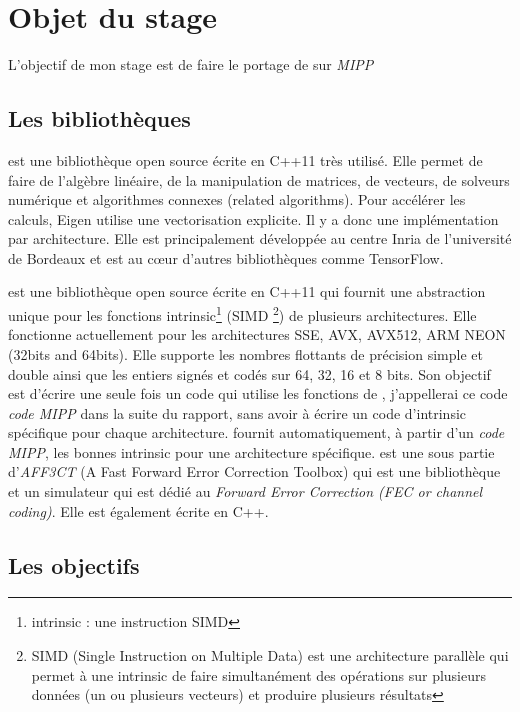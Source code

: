 \section{Objet du stage}

L'objectif de mon stage est de faire le portage de \Eigen sur \emph{MIPP}

\subsection{Les bibliothèques}

\Eigen est une bibliothèque open source écrite en C++11 très utilisé. Elle permet
de faire de l'algèbre linéaire, de la manipulation de matrices, de vecteurs,
de solveurs numérique et algorithmes connexes (related algorithms). Pour accélérer les
calculs, Eigen utilise une vectorisation explicite. Il y a donc une implémentation par
architecture. Elle est principalement développée au centre Inria de l'université de
Bordeaux et est au cœur d'autres bibliothèques comme TensorFlow.


\MIPP est une bibliothèque open source écrite en C++11 qui fournit une abstraction
unique pour les fonctions intrinsic\footnote{intrinsic : une instruction SIMD} (SIMD
\footnote{SIMD (Single Instruction on Multiple Data) est une architecture parallèle
qui permet à une intrinsic de faire simultanément des opérations sur plusieurs données
(un ou plusieurs vecteurs) et produire plusieurs résultats}) de plusieurs architectures.
Elle fonctionne actuellement pour les architectures SSE, AVX, AVX512, ARM NEON (32bits and
64bits). Elle supporte les nombres flottants de précision simple et double ainsi que les
entiers signés et codés sur 64, 32, 16 et 8 bits. Son objectif est d'écrire une seule fois un
code qui utilise les fonctions de \MIPP, j'appellerai ce code \emph{code MIPP} dans
la suite du rapport, sans avoir à écrire un code d'intrinsic spécifique pour chaque
architecture. \MIPP fournit automatiquement, à partir d'un \emph{code MIPP}, les
bonnes intrinsic pour une architecture spécifique. \MIPP est une sous partie
d'\emph{AFF3CT} (A Fast Forward Error Correction Toolbox) qui est une bibliothèque et un
simulateur qui est dédié au \emph{Forward Error Correction (FEC or channel coding)}. Elle
est également écrite en C++.

\subsection{Les objectifs}

